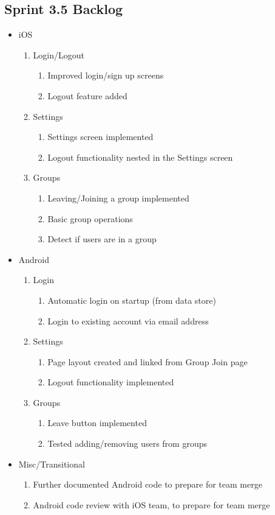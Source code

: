 \subsection{Sprint 3.5 Backlog}
\begin{itemize}
	\item iOS
		\begin{enumerate}
		\item Login/Logout
			\begin{enumerate}
			\item Improved login/sign up screens
			\item Logout feature added
			\end{enumerate}
		\item Settings
			\begin{enumerate}
			\item Settings screen implemented
			\item Logout functionality nested in the Settings screen
			\end{enumerate}
		\item Groups
			\begin{enumerate}
			\item Leaving/Joining a group implemented
			\item Basic group operations
			\item Detect if users are in a group
			\end{enumerate}
		\end{enumerate}
		
	\item Android
		\begin{enumerate}
		\item Login
			\begin{enumerate}
			\item Automatic login on startup (from data store)
			\item Login to existing account via email address
			\end{enumerate}
		\item Settings
			\begin{enumerate}
			\item Page layout created and linked from Group Join page
			\item Logout functionality implemented
			\end{enumerate}
		\item Groups
			\begin{enumerate}
			\item Leave button implemented
			\item Tested adding/removing users from groups
			\end{enumerate}
		\end{enumerate}

	\item Misc/Transitional
		\begin{enumerate}
			\item Further documented Android code to prepare for team merge
			\item Android code review with iOS team, to prepare for team merge
		\end{enumerate}

	\end{itemize}
